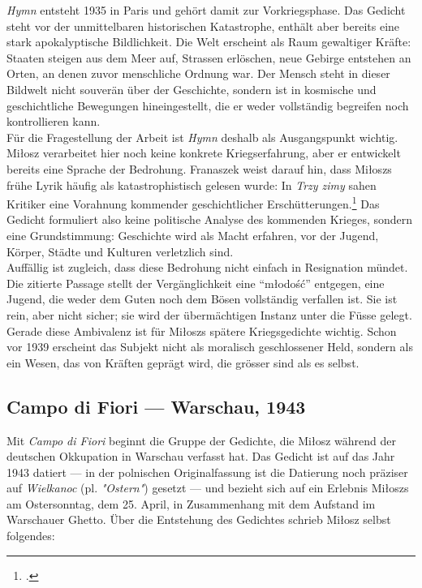 {\itshape Hymn} entsteht 1935 in Paris und gehört damit zur Vorkriegsphase. Das Gedicht steht vor der unmittelbaren historischen Katastrophe, enthält aber bereits eine stark apokalyptische Bildlichkeit. Die Welt erscheint als Raum gewaltiger Kräfte: Staaten steigen aus dem Meer auf, Strassen erlöschen, neue Gebirge entstehen an Orten, an denen zuvor menschliche Ordnung war. Der Mensch steht in dieser Bildwelt nicht souverän über der Geschichte, sondern ist in kosmische und geschichtliche Bewegungen hineingestellt, die er weder vollständig begreifen noch kontrollieren kann.
\\[6pt]
Für die Fragestellung der Arbeit ist {\itshape Hymn} deshalb als Ausgangspunkt wichtig. Miłosz verarbeitet hier noch keine konkrete Kriegserfahrung, aber er entwickelt bereits eine Sprache der Bedrohung. Franaszek weist darauf hin, dass Miłoszs frühe Lyrik häufig als katastrophistisch gelesen wurde: In {\itshape Trzy zimy} sahen Kritiker eine Vorahnung kommender geschichtlicher Erschütterungen.\footcite[vgl.][147--151]{franaszek-2017} Das Gedicht formuliert also keine politische Analyse des kommenden Krieges, sondern eine Grundstimmung: Geschichte wird als Macht erfahren, vor der Jugend, Körper, Städte und Kulturen verletzlich sind.
\\[6pt]
Auffällig ist zugleich, dass diese Bedrohung nicht einfach in Resignation mündet. Die zitierte Passage stellt der Vergänglichkeit eine ``młodość'' entgegen, eine Jugend, die weder dem Guten noch dem Bösen vollständig verfallen ist. Sie ist rein, aber nicht sicher; sie wird der übermächtigen Instanz unter die Füsse gelegt. Gerade diese Ambivalenz ist für Miłoszs spätere Kriegsgedichte wichtig. Schon vor 1939 erscheint das Subjekt nicht als moralisch geschlossener Held, sondern als ein Wesen, das von Kräften geprägt wird, die grösser sind als es selbst.

\subsection{Campo di Fiori — Warschau, 1943}

Mit \textit{Campo di Fiori} beginnt die Gruppe der Gedichte, die Miłosz während der deutschen Okkupation in Warschau verfasst hat. Das Gedicht ist auf das Jahr 1943 datiert — in der polnischen Originalfassung ist die Datierung noch präziser auf \textit{Wielkanoc} (pl. \textit{"Ostern"}) gesetzt — und bezieht sich auf ein Erlebnis Miłoszs am Ostersonntag, dem 25. April, in Zusammenhang mit dem Aufstand im Warschauer Ghetto. Über die Entstehung des Gedichtes schrieb Miłosz selbst folgendes:

